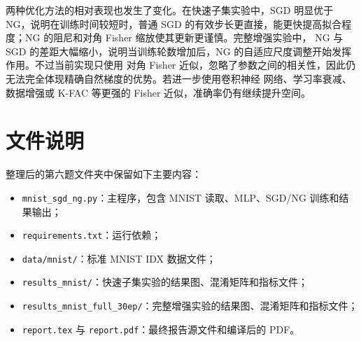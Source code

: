 \documentclass[UTF8]{ctexart}
\begin{document}
两种优化方法的相对表现也发生了变化。在快速子集实验中，SGD 明显优于 NG，说明在训练时间较短时，普通
SGD 的有效步长更直接，能更快提高拟合程度；NG 的阻尼和对角 Fisher 缩放使其更新更谨慎。完整增强实验中，
NG 与 SGD 的差距大幅缩小，说明当训练轮数增加后，NG 的自适应尺度调整开始发挥作用。不过当前实现只使用
对角 Fisher 近似，忽略了参数之间的相关性，因此仍无法完全体现精确自然梯度的优势。若进一步使用卷积神经
网络、学习率衰减、数据增强或 K-FAC 等更强的 Fisher 近似，准确率仍有继续提升空间。

\section{文件说明}

整理后的第六题文件夹中保留如下主要内容：
\begin{itemize}
  \item \texttt{mnist\_sgd\_ng.py}：主程序，包含 MNIST 读取、MLP、SGD/NG 训练和结果输出；
  \item \texttt{requirements.txt}：运行依赖；
  \item \texttt{data/mnist/}：标准 MNIST IDX 数据文件；
  \item \texttt{results\_mnist/}：快速子集实验的结果图、混淆矩阵和指标文件；
  \item \texttt{results\_mnist\_full\_30ep/}：完整增强实验的结果图、混淆矩阵和指标文件；
  \item \texttt{report.tex} 与 \texttt{report.pdf}：最终报告源文件和编译后的 PDF。
\end{itemize}
\end{document}
